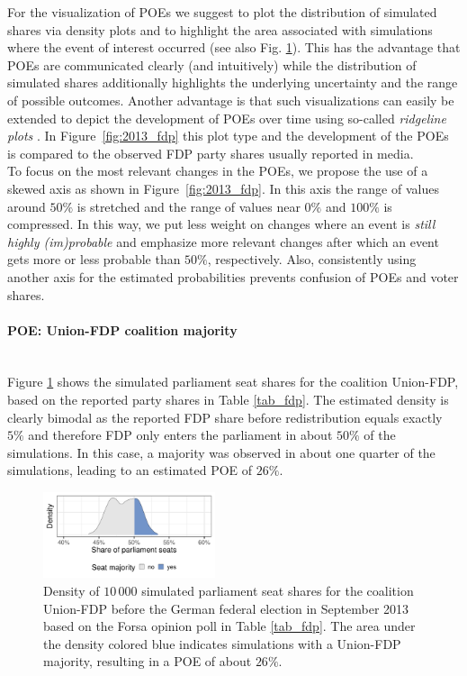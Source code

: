 \documentclass[smallcondensed]{svjour3_edited}     %
\begin{document}
For the visualization of POEs we suggest to plot the distribution of
simulated shares via density plots and to highlight the area associated
with simulations where the event of interest occurred
(see also Fig. \ref{fig:seatDist}). This has the advantage that POEs are
communicated clearly (and intuitively) while the distribution of simulated
shares additionally highlights the underlying uncertainty and the range
of possible outcomes. Another advantage is that such visualizations can easily
be extended to depict the development of POEs over time using so-called
\emph{ridgeline plots} \citep{wilke_2017}. In Figure~\ref{fig:2013_fdp} this
plot type and the development of the POEs is compared to the observed 
FDP party shares usually reported in media. \\

To focus on the most relevant changes in the POEs, we propose
the use of a skewed axis as shown in Figure~\ref{fig:2013_fdp}. In this axis
the range of values around $50\%$ is stretched and the range of values near
$0\%$ and $100\%$ is compressed. In this way, we put less weight on changes
where an event is {\it still highly (im)probable} and emphasize more relevant
changes after which an event gets more or less probable than $50\%$, respectively. Also,
consistently using another axis for the estimated probabilities prevents
confusion of POEs and voter shares.


\paragraph{POE: Union-FDP coalition majority} \ \\

Figure \ref{fig:seatDist} shows the simulated parliament seat shares for the
coalition Union-FDP, based on the reported party shares in Table \ref{tab_fdp}.
The estimated density is clearly bimodal as the reported FDP share before
redistribution equals exactly $5\%$ and therefore FDP only enters the parliament
in about $50\%$ of the simulations. In this case, a majority was observed in about
one quarter of the simulations, leading to an estimated POE of $26\%$. \\

\begin{figure}[H]\centering
\includegraphics[width=0.45\textwidth]{fig_2013_forsa_cdufdp_lastPreelectionPoll.pdf}
\caption{Density of $10\,000$ simulated parliament seat shares for the coalition
Union-FDP before the German federal election in September 2013 based on the Forsa
opinion poll in Table \ref{tab_fdp}. The area under the density colored blue
indicates simulations with a Union-FDP majority, resulting in a
POE of about $26\%$.
\label{fig:seatDist}
}
\end{figure}
\end{document}
